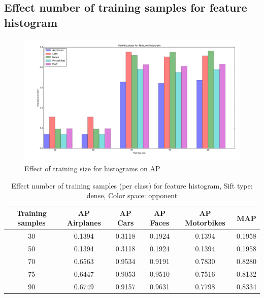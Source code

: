 \subsection{Effect number of training samples for feature histogram}
\begin{figure}[H]
\includegraphics[width=\textwidth]{plots/training_size_feature_histograms}
\caption{Effect of training size for histograms on AP}
\end{figure}
\begin{table}[H]
\begin{tabular}{|c|ccccc|}
\hline
\textbf{Training samples} & \textbf{AP Airplanes} & \textbf{AP Cars} & \textbf{AP Faces} & \textbf{AP Motorbikes} & \textbf{MAP}\\
\hline
30 & 0.1394 & 0.3118& 0.1924& 0.1394 & 0.1958\\
50 & 0.1394 & 0.3118& 0.1924& 0.1394 & 0.1958\\
70 & 0.6563 & 0.9534 & 0.9191 & 0.7830 & 0.8280\\
75 & 0.6447 & 0.9053 & 0.9510 & 0.7516 & 0.8132\\
90 & 0.6749 & 0.9157 & 0.9631 & 0.7798 & 0.8334\\
\hline
\end{tabular}
\caption{Effect number of training samples (per class) for feature histogram, Sift type: dense, Color space: opponent}
\end{table}


